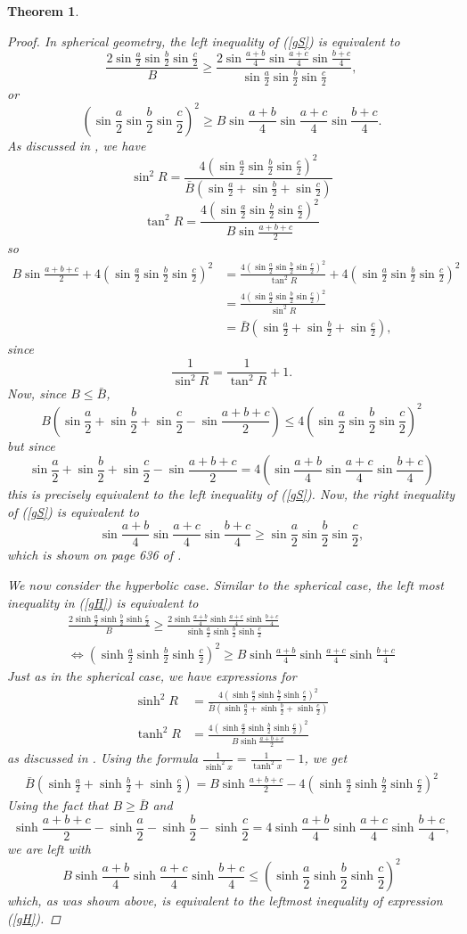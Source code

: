 \documentclass[12pt,notitlepage]{amsart}%
\newtheorem{theorem}{Theorem}[section]
\newcommand{\s}[1]{\sin \frac{#1}{2}}
\newcommand{\sh}[1]{\sinh \frac{#1}{2}}
\newcommand{\f}[1]{\sin \frac{#1}{4}}
\newcommand{\fh}[1]{\sinh \frac{#1}{4}}
\begin{document}
\begin{theorem}
\begin{proof}
  	In spherical geometry, the left inequality of (\ref{gS}) is equivalent to
    \[\frac{2\s{a}\s{b}\s{c}}{B}\geq \frac{2\f{a+b}\f{a+c}\f{b+c}}{\s{a}\s{b}\s{c}},\]
    or 
    \[(\s{a}\s{b}\s{c})^2\geq B\f{a+b}\f{a+c}\f{b+c}.\]   
    As discussed in \cite{GN}, we have
    \[\sin^2R=\frac{4(\s{a}\s{b}\s{c})^2}{\bar{B}(\s{a}+\s{b}+\s{c})}\]
    \[\tan^2R=\frac{4(\s{a}\s{b}\s{c})^2}{B\s{a+b+c}}\]
    so
    \begin{align*}
 B\s{a+b+c}+4(\s{a}\s{b}\s{c})^2&=\frac{4(\s{a}\s{b}\s{c})^2}{\tan^2R}+4(\s{a}\s{b}\s{c})^2\\
 	&=\frac{4(\s{a}\s{b}\s{c})^2}{\sin^2R}\\
    &=\bar{B}(\s{a}+\s{b}+\s{c}),
        \end{align*}
     since \[\frac{1}{\sin^2R}=\frac{1}{\tan^2R}+1.\]
     Now, since $B\leq\bar{B}$,    
    \[B\left( \s{a}+\s{b}+\s{c}-\s{a+b+c}\right) \leq4(\s{a}\s{b}\s{c})^2\]
    but since
    \[\s{a}+\s{b}+\s{c}-\s{a+b+c}=4\left( \f{a+b}\f{a+c}\f{b+c}\right)\]
        this is precisely equivalent to the left inequality of (\ref{gS}).
        Now, the right inequality of (\ref{gS}) is equivalent to 
        \[\f{a+b}\f{a+c}\f{b+c}\geq\s{a}\s{b}\s{c},\]
        which is shown on page 636 of \cite{MPV}.
        
    We now consider the hyperbolic case. Similar to the spherical case, the left most inequality in (\ref{gH}) is equivalent to 
    \begin{align*}
    \frac{2\sh{a}\sh{b}\sh{c}}{B}\geq \frac{2\fh{a+b}\fh{a+c}\fh{b+c}}{\sh{a}\sh{b}\sh{c}} \\
    \iff (\sh{a}\sh{b}\sh{c})^2 \geq B \fh{a+b} \fh{a+c} \fh{b+c}
	\end{align*}
    Just as in the spherical case, we have expressions for 
    \begin{align*}
    \sinh^2 R &= \frac{4(\sh{a}\sh{b}\sh{c})^2}{\bar{B}(\sh{a}+\sh{b}+\sh{c})} \\
    \tanh^2 R &= \frac{4(\sh{a}\sh{b}\sh{c})^2}{B \sh{a+b+c}}
    \end{align*}
    as discussed in \cite{GN}. Using the formula $\frac{1}{\sinh^2x} = \frac{1}{\tanh^2 x} -1$, we get
    \begin{align*}
    \bar{B}\left(\sh{a}+\sh{b}+\sh{c}\right) = B \sh{a+b+c} - 4\left(\sh{a}\sh{b}\sh{c}\right)^2
    \end{align*}
    Using the fact that $B \geq \bar{B}$ and \[\sh{a+b+c}-\sh{a}-\sh{b}-\sh{c} = 4\fh{a+b}\fh{a+c}\fh{b+c},\] we are left with
    \begin{equation*}
    B\fh{a+b}\fh{a+c}\fh{b+c} \leq \left(\sh{a}\sh{b}\sh{c}\right)^2
    \end{equation*}
    which, as was shown above, is equivalent to the leftmost inequality of expression (\ref{gH}).
   \end{proof}
\end{theorem}
\end{document}
